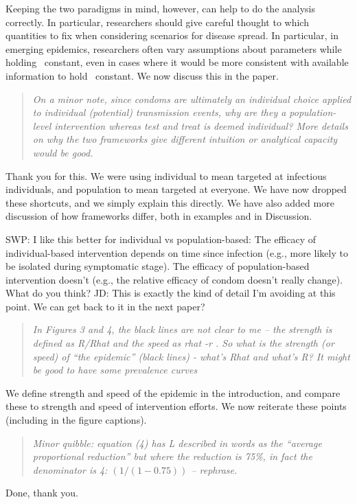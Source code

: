 Keeping the two paradigms in mind, however, can help to do the analysis correctly. 
In particular, researchers should give careful thought to which quantities to fix when considering scenarios for disease spread. 
In particular, in emerging epidemics, researchers often vary assumptions about parameters while holding \RR\ constant, even in cases where it would be more consistent with available information to hold \rr\ constant.
We now discuss this in the paper.

\begin{quote}\sl
On a minor note, since condoms are ultimately an individual choice
applied to individual (potential) transmission events, why are they a
population-level intervention whereas test and treat is deemed
individual? More details on why the two frameworks give different
intuition or analytical capacity would be good.
\end{quote}

Thank you for this. We were using individual to mean targeted at
infectious individuals, and population to mean targeted at everyone. We
have now dropped these shortcuts, and we simply explain this directly. We have also added more discussion of how frameworks differ, both in examples and in Discussion.

SWP: I like this better for individual vs population-based: The efficacy
of individual-based intervention depends on time since infection (e.g.,
more likely to be isolated during symptomatic stage). The efficacy of
population-based intervention doesn't (e.g., the relative efficacy of
condom doesn't really change). What do you think?
JD: This is exactly the kind of detail I'm avoiding at this point. We can get back to it in the next paper?

\begin{quote}\sl
In Figures 3 and 4, the black lines are not clear to me -- the strength
is defined as R/Rhat and the speed as rhat -r . So what is the strength
(or speed) of ``the epidemic'' (black lines) - what's Rhat and what's R?
It might be good to have some prevalence curves
\end{quote}

We define strength and speed of the epidemic in the introduction, and
compare these to strength and speed of intervention efforts. We now
reiterate these points (including in the figure captions).

\begin{quote}\sl
Minor quibble: equation (4) has L described in words as the ``average
proportional reduction'' but where the reduction is 75\%, in fact the
denominator is 4: $(1 / (1-0.75) )$ -- rephrase.
\end{quote}

Done, thank you.


